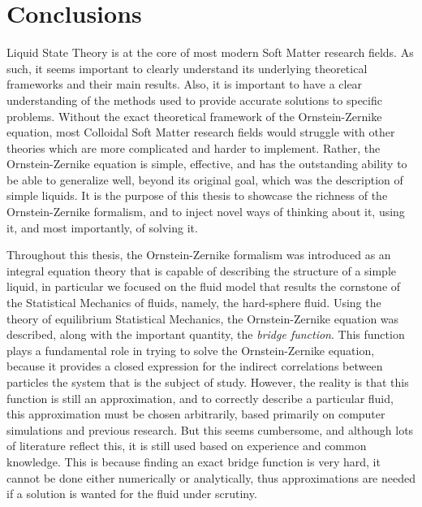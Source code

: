 \chapter{Conclusions}
\label{Cap6}

Liquid State Theory is at the core of most modern Soft Matter research fields. As such, it 
seems important to clearly understand its underlying theoretical frameworks and their main 
results. Also, it is important to have a clear understanding of the methods used to provide 
accurate solutions to specific problems. Without the exact theoretical framework of the 
Ornstein-Zernike equation, most Colloidal Soft Matter research fields would struggle with 
other theories which are more complicated and harder to implement. Rather, the 
Ornstein-Zernike equation is simple, effective, and has the outstanding ability to be able 
to generalize well, beyond its original goal, which was the description of simple liquids. 
It is the purpose of this thesis to showcase the richness of the Ornstein-Zernike 
formalism, and to inject novel ways of thinking about it, using it, and most importantly, 
of solving it.

Throughout this thesis, the Ornstein-Zernike formalism was introduced as an integral 
equation theory that is capable of describing the structure of a simple liquid, in 
particular we focused on the fluid model that results the cornstone of the Statistical 
Mechanics of fluids,  namely,  the hard-sphere fluid. Using the theory of equilibrium 
Statistical Mechanics, the Ornstein-Zernike equation was described, along with the 
important quantity, the \emph{bridge function}. This function plays a fundamental role in 
trying to solve the Ornstein-Zernike equation, because it provides a closed expression  for 
the indirect correlations between particles the system that is the subject of study. 
However, the reality is that this function is still an approximation, and to correctly 
describe a particular fluid, this approximation must be chosen arbitrarily, based primarily 
on computer simulations and previous research. But this seems cumbersome, 
and although lots of literature reflect this, it is still used based on experience and 
common knowledge. This is because finding an exact bridge function is very hard, it cannot 
be done either numerically or analytically, thus approximations are needed if a solution is 
wanted for the fluid under scrutiny.

